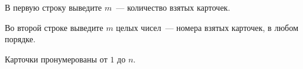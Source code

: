 В первую строку выведите $m$~--- количество взятых карточек.

Во второй строке выведите $m$ целых чисел~--- номера взятых карточек, в любом порядке.

Карточки пронумерованы от $1$ до $n$.